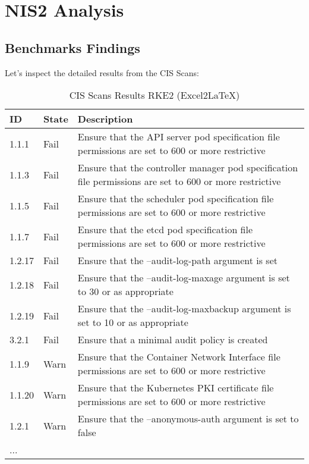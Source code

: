 %
%

\pagebreak
\section{NIS2 Analysis}

\onehalfspacing

\subsection{Benchmarks Findings}

Let's inspect the detailed results from the CIS Scans:

\begin{table}[h]
  \centering
  \caption{CIS Scans Results RKE2 (Excel2LaTeX)}
    \begin{tabular}{| l | l | p{11.6cm} |}
    \hline
    ID & State & Description \\
    \hline\hline
    1.1.1 & Fail  & Ensure that the API server pod specification file permissions are set to 600 or more restrictive \\
    \hline
    1.1.3 & Fail  & Ensure that the controller manager pod specification file permissions are set to 600 or more restrictive \\
    \hline
    1.1.5 & Fail  & Ensure that the scheduler pod specification file permissions are set to 600 or more restrictive \\
    \hline
    1.1.7 & Fail  & Ensure that the etcd pod specification file permissions are set to 600 or more restrictive \\
    \hline
    1.2.17 & Fail  & Ensure that the --audit-log-path argument is set \\
    \hline
    1.2.18 & Fail  & Ensure that the --audit-log-maxage argument is set to 30 or as appropriate \\
    \hline
    1.2.19 & Fail  & Ensure that the --audit-log-maxbackup argument is set to 10 or as appropriate \\
    \hline
    3.2.1 & Fail  & Ensure that a minimal audit policy is created \\
    \hline
    1.1.9 & Warn  & Ensure that the Container Network Interface file permissions are set to 600 or more restrictive \\
    \hline
    1.1.20 & Warn  & Ensure that the Kubernetes PKI certificate file permissions are set to 600 or more restrictive \\
    \hline
    1.2.1 & Warn  & Ensure that the --anonymous-auth argument is set to false \\
    \hline
    ... & & \\
    \hline
    \end{tabular}%
  \label{tab:rke2Scan}%
\end{table}%

